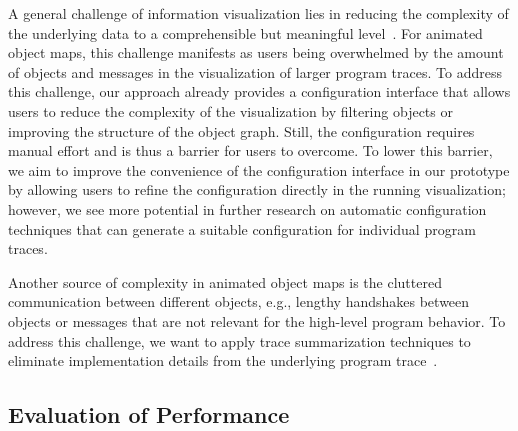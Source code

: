 A general challenge of information visualization lies in reducing the complexity of the underlying data to a comprehensible but meaningful level~\cite{robertson2009scale}.
For animated object maps, this challenge manifests as users being overwhelmed by the amount of objects and messages in the visualization of larger program traces.
To address this challenge, our approach already provides a configuration interface that allows users to reduce the complexity of the visualization by filtering objects or improving the structure of the object graph.
Still, the configuration requires manual effort and is thus a barrier for users to overcome.
To lower this barrier, we aim to improve the convenience of the configuration interface in our prototype by allowing users to refine the configuration directly in the running visualization; however, we see more potential in further research on automatic configuration techniques that can generate a suitable configuration for individual program traces.

Another source of complexity in animated object maps is the cluttered communication between different objects, e.g., lengthy handshakes between objects or messages that are not relevant for the high-level program behavior.
To address this challenge, we want to apply trace summarization techniques to eliminate implementation details from the underlying program trace~\cite{hamouLhadj2006summarizing,noda2017identifying}.

\subsection{Evaluation of Performance}

\begin{table*}
	\centering
	\caption{
		Performance evaluation of the \tfd{} prototype for different program traces with respect to frame rate, memory consumption, and saving/loading times.
		We measure the frame rate both during the initial force simulation and afterward when playing the animation of the program trace.
		We found the frame rate to be sufficient for most of the considered program traces but see the need for optimization for larger program traces with respect to trace serialization, force simulation, and 3D rendering.
	}
	\label{tab:discussion/performance}
	\begin{threeparttable}
		\centering
		{\footnotesize
		}
	\end{threeparttable}
\end{table*}

